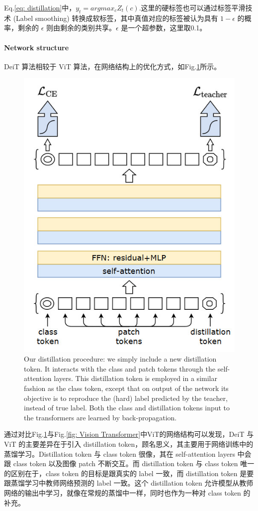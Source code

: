 \documentclass[letterpaper,10pt]{article}
\begin{document}
	Eq.\ref{eq: distillation}中，$y_t = argmax_{c} Z_t(c)$.这里的硬标签也可以通过标签平滑技术 (Label smoothing) 转换成软标签，其中真值对应的标签被认为具有 $1-\epsilon$ 的概率，剩余的 $\epsilon$ 则由剩余的类别共享。$\epsilon$ 是一个超参数，这里取0.1。
	
	\paragraph{Network structure}
	
	DeiT 算法相较于 ViT 算法，在网络结构上的优化方式，如Fig.\ref{fig: DeiT-network-structure}所示。
	
	\begin{figure}[htbp]
		\centering 
		\includegraphics[width=0.5
		\columnwidth]{picture/DeiT-network-structure}
		\caption{
			\label{fig: DeiT-network-structure} Our distillation procedure: we simply include a new distillation token. It interacts with the class and patch tokens through the self-attention layers. This distillation token is employed in a similar fashion as the class token, except that on output of the network its objective is to reproduce the (hard) label predicted by the teacher, instead of true label. Both the class and distillation tokens input to the transformers are learned by back-propagation.
		}
	\end{figure}
	
	通过对比Fig.\ref{fig: DeiT-network-structure}与Fig.\ref{fig: Vision Transformer}中ViT的网络结构可以发现，DeiT 与 ViT 的主要差异在于引入 distillation token，顾名思义，其主要用于网络训练中的蒸馏学习。Distillation token 与 class token 很像，其在 self-attention layers 中会跟 class token 以及图像 patch 不断交互。而 distillation token 与 class token 唯一的区别在于，class token 的目标是跟真实的 label 一致，而 distillation token 是要跟蒸馏学习中教师网络预测的 label 一致。这个 distillation token 允许模型从教师网络的输出中学习，就像在常规的蒸馏中一样，同时也作为一种对 class token 的补充。
	
\end{document}
